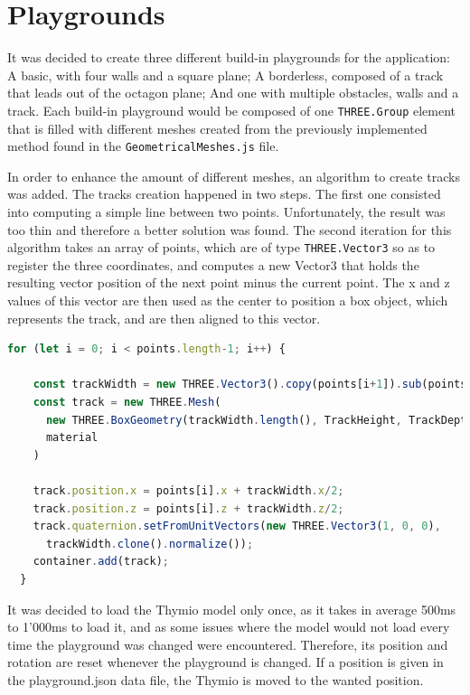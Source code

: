 \documentclass{scrreprt}
\begin{document}
\section{Playgrounds}

It was decided to create three different build-in playgrounds for the application: A basic, with four walls and a square plane; A borderless, composed of a track that leads out of the octagon plane; And one with multiple obstacles, walls and a track. 
Each build-in playground would be composed of one \texttt{THREE.Group} element that is filled with different meshes created from the previously implemented method found in the \texttt{GeometricalMeshes.js} file.

In order to enhance the amount of different meshes, an algorithm to create tracks was added. The tracks creation happened in two steps. The first one consisted into computing a simple line between two points. 
Unfortunately, the result was too thin and therefore a better solution was found.
The second iteration for this algorithm takes an array of points, which are of type \texttt{THREE.Vector3} so as to register the three coordinates, and computes
a new Vector3 that holds the resulting vector position of the next point minus the current point. The x and z values of this vector are then used
as the center to position a box object, which represents the track, and are then aligned to this vector.

\begin{lstlisting}[language=JavaScript, gobble=2, basicstyle=\ttfamily\small]
  for (let i = 0; i < points.length-1; i++) {

    const trackWidth = new THREE.Vector3().copy(points[i+1]).sub(points[i]);
    const track = new THREE.Mesh(
      new THREE.BoxGeometry(trackWidth.length(), TrackHeight, TrackDepth),
      material
    )

    track.position.x = points[i].x + trackWidth.x/2;
    track.position.z = points[i].z + trackWidth.z/2;
    track.quaternion.setFromUnitVectors(new THREE.Vector3(1, 0, 0), 
      trackWidth.clone().normalize());
    container.add(track);      
  }
\end{lstlisting} 

It was decided to load the Thymio model only once, as it takes in average 500ms to 1'000ms to load it, and as some issues where the model would not load every time the playground was changed were encountered.
Therefore, its position and rotation are reset whenever the playground is changed. If a position is given in the playground.json data file, the Thymio is moved to the wanted position.
\end{document}
